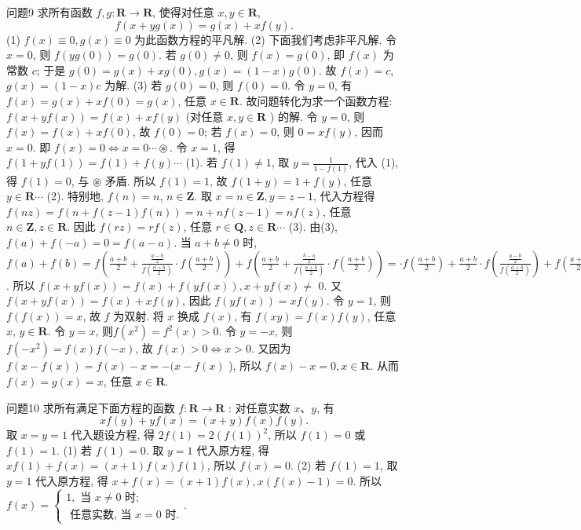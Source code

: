 问题9 求所有函数 $f, g: \mathbf{R} \rightarrow \mathbf{R}$, 使得对任意 $x, y \in \mathbf{R}$,
$$
f(x+y g(x))=g(x)+x f(y) .
$$
(1) $f(x) \equiv 0, g(x) \equiv 0$ 为此函数方程的平凡解.
(2) 下面我们考虑非平凡解.
令 $x=0$, 则 $f(y g(0))=g(0)$. 若 $g(0) \neq 0$, 则 $f(x)=g(0)$, 即 $f(x)$ 为常数 $c$; 于是 $g(0)=g(x)+x g(0), g(x)=(1-x) g(0)$. 故 $f(x)=c$, $g(x)=(1-x) c$ 为解.
(3) 若 $g(0)=0$, 则 $f(0)=0$. 令 $y=0$, 有 $f(x)=g(x)+x f(0)=g(x)$, 任意 $x \in \mathbf{R}$. 
故问题转化为求一个函数方程: $f(x+y f(x))=f(x)+x f(y)$ (对任意 $x, y \in \mathbf{R}$ ) 的解.
令 $y=0$, 则 $f(x)=f(x)+x f(0)$, 故 $f(0)=0$; 若 $f(x)=0$, 则 $0=x f(y)$, 因而 $x=0$. 即 $f(x)=0 \Leftrightarrow x=0 \cdots \circledast$. 令 $x=1$, 得 $f(1+y f(1))=f(1)+f(y) \cdots$ (1). 
若 $f(1) \neq 1$, 取 $y=\frac{1}{1-f(1)}$, 代入 (1), 得 $f(1)=0$, 与 $\circledast$ 矛盾.
所以 $f(1)=1$, 故 $f(1+y)=1+f(y)$, 任意 $y \in \mathbf{R} \cdots$ (2). 
特别地, $f(n)=n$, $n \in \mathbf{Z}$. 取 $x=n \in \mathbf{Z}, y=z-1$, 代入方程得 $f(n z)=f(n+f(z-1) f(n))= n+n f(z-1)=n f(z)$, 任意 $n \in \mathbf{Z}, z \in \mathbf{R}$. 
因此 $f(r z)=r f(z)$, 任意 $r \in \mathbf{Q}, z \in \mathbf{R} \cdots$ (3). 
由(3), $f(a)+f(-a)=0=f(a-a)$. 当 $a+b \neq 0$ 时, $f(a)+ f(b)=f\left(\frac{a+b}{2}+\frac{\frac{a-b}{2}}{f\left(\frac{a+b}{2}\right)} \cdot f\left(\frac{a+b}{2}\right)\right)+f\left(\frac{a+b}{2}+\frac{\frac{b-a}{2}}{f\left(\frac{a+b}{2}\right)} \cdot f\left(\frac{a+b}{2}\right)\right)=\cdot f\left(\frac{a+b}{2}\right)+\frac{a+b}{2} \cdot f\left(\frac{\frac{a-b}{2}}{f\left(\frac{a+b}{2}\right)}\right)+f\left(\frac{a+b}{2}\right)+\frac{a+b}{2} f\left(\frac{\frac{b-a}{2}}{f\left(\frac{a+b}{2}\right)}\right)= 2 f\left(\frac{a+b}{2}\right)=f(a+b)$. 
所以 $f(x+y f(x))=f(x)+f(y f(x)), x+y f(x) \neq$ 0. 
又 $f(x+y f(x))=f(x)+x f(y)$, 因此 $f(y f(x))=x f(y)$. 
令 $y=1$, 则 $f(f(x))=x$, 故 $f$ 为双射.
将 $x$ 换成 $f(x)$, 有 $f(x y)=f(x) f(y)$, 任意 $x$, $y \in \mathbf{R}$. 令 $y=x$, 则$f\left(x^2\right)=f^2(x)>0$. 
令 $y=-x$, 则 $f\left(-x^2\right)=f(x) f(-x)$, 故 $f(x)>0 \Leftrightarrow x>0$. 
又因为 $f(x-f(x))=f(x)-x=-(x- f(x)$ ), 所以 $f(x)-x=0, x \in \mathbf{R}$. 从而 $f(x)=g(x)=x$, 任意 $x \in \mathbf{R}$.



问题10 求所有满足下面方程的函数 $f: \mathbf{R} \rightarrow \mathbf{R}$ : 对任意实数 $x 、 y$, 有
$$
x f(y)+y f(x)=(x+y) f(x) f(y) .
$$
取 $x=y=1$ 代入题设方程, 得 $2 f(1)=2(f(1))^2$, 所以 $f(1)=0$ 或 $f(1)=1$. (1) 若 $f(1)=0$. 取 $y=1$ 代入原方程, 得 $x f(1)+f(x)= (x+1) f(x) f(1)$, 所以 $f(x)=0$. (2) 若 $f(1)=1$, 取 $y=1$ 代入原方程, 得 $x+f(x)=(x+1) f(x), x(f(x)-1)=0$. 所以 $f(x)= \begin{cases}1,  \text { 当 } x \neq 0 \text { 时; } \\ \text { 任意实数, 当 } x=0 \text { 时.
}\end{cases}$.



